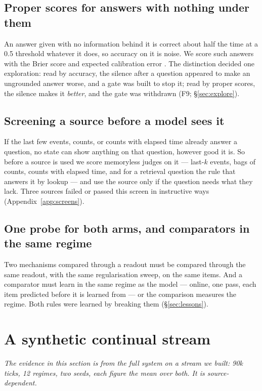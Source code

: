 \documentclass[11pt,a4paper]{article}
\theoremstyle{plain}
\theoremstyle{definition}
\theoremstyle{remark}
\begin{document}
\subsection{Proper scores for answers with nothing under them}

An answer given with no information behind it is correct about half the time
at a 0.5 threshold whatever it does, so accuracy on it is noise. We score such
answers with the Brier score and expected calibration error
\citep{brier1950verification}. The distinction decided one exploration: read by
accuracy, the silence after a question appeared to make an ungrounded answer
worse, and a gate was built to stop it; read by proper scores, the silence makes
it \emph{better}, and the gate was withdrawn (F9; \S\ref{sec:explore}).

\subsection{Screening a source before a model sees it}

If the last few events, counts, or counts with elapsed time already answer a
question, no state can show anything on that question, however good it is. So
before a source is used we score memoryless judges on it --- last-$k$ events,
bags of counts, counts with elapsed time, and for a retrieval question the rule
that answers it by lookup --- and use the source only if the question needs
what they lack. Three sources failed or passed this screen in instructive ways
(Appendix~\ref{app:screens}).

\subsection{One probe for both arms, and comparators in the same regime}

Two mechanisms compared through a readout must be compared through the same
readout, with the same regularisation sweep, on the same items. And a
comparator must learn in the same regime as the model --- online, one pass,
each item predicted before it is learned from --- or the comparison measures
the regime. Both rules were learned by breaking them (\S\ref{sec:lessons}).

\section{A synthetic continual stream}
\label{sec:synthetic}

\emph{The evidence in this section is from the full system on a stream we built:
90k ticks, 12 regimes, two seeds, each figure the mean over both. It is
source-dependent.}
\end{document}

